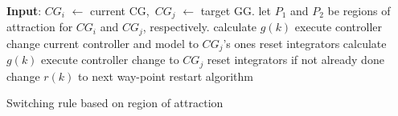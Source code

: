 \begin{algorithm}[H]
	\begin{algorithmic}[1]
		\State{}\textbf{Input}: \(CG_i\) \(\leftarrow{}\) current CG,~\(CG_j\) \(\leftarrow{}\)
				target GG.\@
		\State{}let \(P_1\) and \(P_2\) be regions of attraction for \(CG_i\)
				and \(CG_j\), respectively.
				\State{}calculate \(g(k)\)
				\State{}execute controller
			\EndWhile{}
			\State{}change current controller and model to \(CG_j\)'s ones
			\State{}reset integrators
		\EndIf{}
			\State{}calculate \(g(k)\)
			\State{}execute controller
		\EndWhile{}
		\State{}change to \(CG_j\)
		\State{}reset integrators if not already done
		\State{}change \(r(k)\) to next way-point
		\State{}restart algorithm
	\end{algorithmic}
	\caption{Switching rule based on region of attraction}%
	\label{alg:roa-rule}
\end{algorithm}
